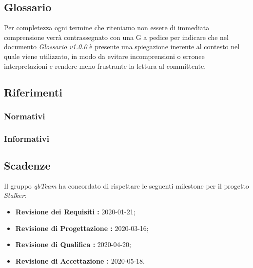 \subsection{Glossario}
Per completezza ogni termine che riteniamo non essere di immediata comprensione verrà contrassegnato con una G a pedice per indicare che nel documento \textit{Glossario v1.0.0} è presente una spiegazione inerente al contesto nel quale viene utilizzato,
in modo da evitare incomprensioni o erronee interpretazioni e rendere meno frustrante la lettura al committente.

\subsection{Riferimenti}
\subsubsection{Normativi}
\subsubsection{Informativi}

\subsection{Scadenze}
Il gruppo \textit{qbTeam} ha concordato di rispettare le seguenti milestone per il progetto \textit{Stalker}:
\begin{itemize}
    \item \textbf{Revisione dei Requisiti : } 2020-01-21;
    \item \textbf{Revisione di Progettazione : } 2020-03-16;
    \item \textbf{Revisione di Qualifica : } 2020-04-20;
    \item \textbf{Revisione di Accettazione : } 2020-05-18.
\end{itemize}